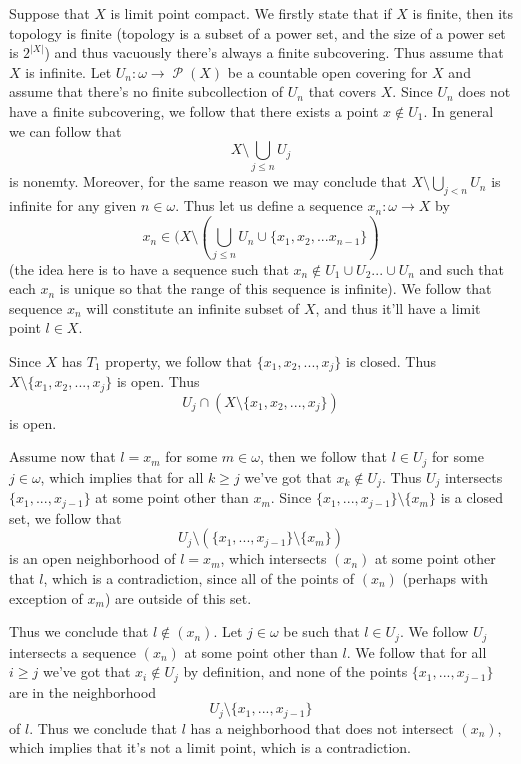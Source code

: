 \documentclass[11pt,oneside,titlepage]{book}
\DeclareMathOperator \pow {\mathcal {P}}
\newcommand{\set}[1]{\{ #1 \}}
\begin{document}
Suppose that $X$ is limit point compact. We firstly state that if $X$ is finite, then its
topology is finite (topology is a subset of a power set, and the size of a power set is $2^{|X|}$)
and thus vacuously there's always a finite subcovering. Thus assume that $X$ is infinite.
Let $U_n : \omega \to \pow(X)$ be a countable
open covering for $X$ and assume that there's no finite subcollection of $U_n$
that covers $X$. Since $U_n$ does not have a finite subcovering, we follow that there exists
a point $x \notin U_1$. In general we can follow that
$$X \setminus \bigcup_{j \leq n}{U_j}$$
is nonemty. Moreover, for the same reason we may conclude that $X \setminus \bigcup_{j < n}{U_n}$
is infinite for any given $n \in \omega$. Thus let us define a sequence $x_n: \omega \to X$ by
$$x_n \in (X \setminus (\bigcup_{j \leq n}{U_n} \cup \set{x_1, x_2, ... x_{n - 1}})$$
(the idea here is to have a sequence such that $x_n \notin U_1 \cup U_2 ... \cup U_n$ and
such that each $x_n$ is unique so that the range of this sequence is infinite). 
We follow that sequence $x_n$ will constitute an infinite subset of $X$, and thus it'll
have a limit point $l \in X$.

Since $X$ has $T_1$ property, we follow that $\set{x_1, x_2, ..., x_j}$ is closed. Thus
$X \setminus \set{x_1, x_2, ..., x_j}$ is open. Thus
$$U_j \cap (X \setminus \set{x_1, x_2, ..., x_j})$$
is open.

Assume now that $l = x_m$ for some $m \in \omega$,
then we follow that $l \in U_j$ for some $j \in \omega$,
which implies that for all $k \geq j$ we've got that $x_k \notin U_j$. Thus $U_j$
intersects $\set{x_1, ..., x_{j - 1}}$ at some point other than $x_m$. Since
$\set{x_1, ..., x_{j - 1}} \setminus \set{x_m}$ is a closed set, we follow that
$$U_j \setminus (\set{x_1, ..., x_{j - 1}} \setminus \set{x_m})$$ is an open
neighborhood of $l = x_m$, which
intersects $(x_n)$ at some point other that $l$, which is a contradiction, since all
of the points of $(x_n)$ (perhaps with exception of $x_m$) are outside of this set.

Thus we conclude that $l \notin (x_n)$. 
Let $j \in \omega$ be such that $l \in U_j$. We follow $U_j$ intersects a sequence $(x_n)$ at
some point other than $l$. We follow that for all $i \geq j$ we've got that $x_i \notin U_j$
by definition, and none of the points $\set{x_1, ..., x_{j - 1}}$ are in the neighborhood
$$U_j \setminus \set{x_1, ..., x_{j - 1}}$$
of $l$.
Thus we conclude that $l$ has a neighborhood that does not intersect $(x_n)$, which implies that
it's not a limit point, which is a contradiction.
\end{document}
